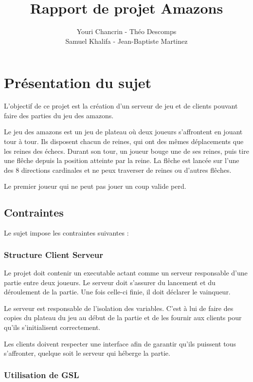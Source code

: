 \documentclass{article}
\author{Youri Chancrin - Th\'eo Descomps\\Samuel Khalifa - Jean-Baptiste Martinez}
\title{Rapport de projet Amazons}
\begin{document}
\maketitle

\section{Pr\'esentation du sujet}

L'objectif de ce projet est la cr\'eation d'un serveur de jeu et de clients pouvant faire des parties 
du jeu des amazons.

Le jeu des amazons est un jeu de plateau o\`u deux joueurs s'affrontent en jouant tour \`a tour.
Ils disposent chacun de reines, qui ont des m\^emes d\'eplacements que les reines des \'echecs.
Durant son tour, un joueur bouge une de ses reines, puis tire une fl\^eche depuis la position atteinte par la reine.
La fl\^eche est lanc\'ee sur l'une des 8 directions cardinales et ne peux traverser de reines ou d'autres fl\^eches.

Le premier joueur qui ne peut pas jouer un coup valide perd.

\subsection{Contraintes}
Le sujet impose les contraintes suivantes :

\subsubsection{Structure Client Serveur}

Le projet doit contenir un executable actant comme un serveur responsable d'une partie entre deux joueurs.
Le serveur doit s'assurer du lancement et du d\'eroulement de la partie. Une fois celle-ci finie, 
il doit d\'eclarer le vainqueur.

Le serveur est responsable de l'isolation des variables. 
C'est \`a lui de faire des copies du plateau du jeu au d\'ebut de la partie et de les fournir aux clients 
pour qu'ils s'initialisent correctement.

Les clients doivent respecter une interface afin de garantir qu'ils puissent tous s'affronter,
quelque soit le serveur qui h\'eberge la partie.

\subsubsection{Utilisation de GSL}
\end{document}
